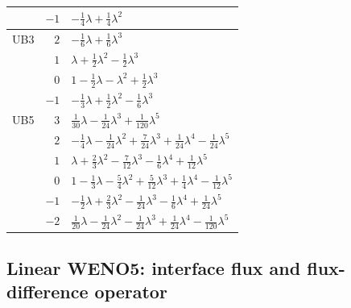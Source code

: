 \documentclass[pdflatex,sn-mathphys-num]{sn-jnl}%
\theoremstyle{thmstyleone}%
\theoremstyle{thmstyletwo}%
\theoremstyle{thmstylethree}%
\begin{document}
\begin{appendices}
\begin{table}[htbp]
\begin{tabular}{@{}lrl@{}}
       & $-1$ & $-\tfrac{1}{4}\lambda + \tfrac{1}{4}\lambda^{2}$                                                                                    \\
\midrule
UB3    & $2$  & $-\tfrac{1}{6}\lambda + \tfrac{1}{6}\lambda^{3}$                                                                                    \\
       & $1$  & $\lambda + \tfrac{1}{2}\lambda^{2} - \tfrac{1}{2}\lambda^{3}$                                                                       \\
       & $0$  & $1 - \tfrac{1}{2}\lambda - \lambda^{2} + \tfrac{1}{2}\lambda^{3}$                                                                   \\
       & $-1$ & $-\tfrac{1}{3}\lambda + \tfrac{1}{2}\lambda^{2} - \tfrac{1}{6}\lambda^{3}$                                                          \\
\midrule
UB5    & $3$  & $\tfrac{1}{30}\lambda - \tfrac{1}{24}\lambda^{3} + \tfrac{1}{120}\lambda^{5}$                                                       \\
       & $2$  & $-\tfrac{1}{4}\lambda - \tfrac{1}{24}\lambda^{2} + \tfrac{7}{24}\lambda^{3} + \tfrac{1}{24}\lambda^{4} - \tfrac{1}{24}\lambda^{5}$  \\
       & $1$  & $\lambda + \tfrac{2}{3}\lambda^{2} - \tfrac{7}{12}\lambda^{3} - \tfrac{1}{6}\lambda^{4} + \tfrac{1}{12}\lambda^{5}$                 \\
       & $0$  & $1 - \tfrac{1}{3}\lambda - \tfrac{5}{4}\lambda^{2} + \tfrac{5}{12}\lambda^{3} + \tfrac{1}{4}\lambda^{4} - \tfrac{1}{12}\lambda^{5}$ \\
       & $-1$ & $-\tfrac{1}{2}\lambda + \tfrac{2}{3}\lambda^{2} - \tfrac{1}{24}\lambda^{3} - \tfrac{1}{6}\lambda^{4} + \tfrac{1}{24}\lambda^{5}$    \\
       & $-2$ & $\tfrac{1}{20}\lambda - \tfrac{1}{24}\lambda^{2} - \tfrac{1}{24}\lambda^{3} + \tfrac{1}{24}\lambda^{4} - \tfrac{1}{120}\lambda^{5}$ \\
\bottomrule
\end{tabular}
\end{table}

\subsection{Linear WENO5: interface flux and flux-difference operator}
\label{app:weno-coefficients}


\end{appendices}
\end{document}
